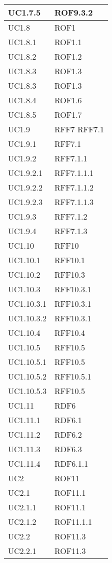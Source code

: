 \begin{center}
\begin{longtable}{| p{4cm} | p{4cm} |}
\hline
UC1.7.5 & ROF9.3.2 \\
\hline
UC1.8 & ROF1 \\
\hline
UC1.8.1 & ROF1.1 \\
\hline
UC1.8.2 & ROF1.2 \\
\hline
UC1.8.3 & ROF1.3 \\
\hline
UC1.8.3 & ROF1.3 \\
\hline
UC1.8.4 & ROF1.6 \\
\hline
UC1.8.5 & ROF1.7 \\
\hline
UC1.9 & RFF7 \newline RFF7.1 \\
\hline
UC1.9.1 & RFF7.1 \\
\hline
UC1.9.2 & RFF7.1.1 \\
\hline
UC1.9.2.1 & RFF7.1.1.1 \\
\hline
UC1.9.2.2 & RFF7.1.1.2 \\
\hline
UC1.9.2.3 & RFF7.1.1.3 \\
\hline
UC1.9.3 & RFF7.1.2 \\
\hline
UC1.9.4 & RFF7.1.3 \\
\hline
UC1.10 & RFF10 \\
\hline
UC1.10.1 & RFF10.1 \\
\hline
UC1.10.2 & RFF10.3 \\
\hline
UC1.10.3 & RFF10.3.1 \\
\hline
UC1.10.3.1 & RFF10.3.1 \\
\hline
UC1.10.3.2 & RFF10.3.1 \\
\hline
UC1.10.4 & RFF10.4 \\
\hline
UC1.10.5 & RFF10.5 \\
\hline
UC1.10.5.1 & RFF10.5 \\
\hline
UC1.10.5.2 & RFF10.5.1 \\
\hline
UC1.10.5.3 & RFF10.5 \\
\hline
UC1.11 & RDF6 \\
\hline
UC1.11.1 & RDF6.1 \\
\hline
UC1.11.2 & RDF6.2 \\
\hline
UC1.11.3 & RDF6.3 \\
\hline
UC1.11.4 & RDF6.1.1 \\
\hline
UC2 & ROF11 \\
\hline
UC2.1 & ROF11.1 \\
\hline
UC2.1.1 & ROF11.1 \\
\hline
UC2.1.2 & ROF11.1.1 \\
\hline
UC2.2 & ROF11.3 \\
\hline
UC2.2.1 & ROF11.3 \\

\end{longtable}
\end{center}
